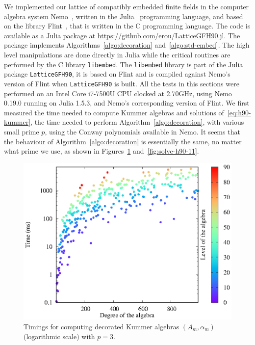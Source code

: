 We implemented our lattice of compatibly embedded finite fields in the computer
algebra system Nemo~\cite{Nemo}, written in the Julia~\cite{Julia} programming
language, and based on the library Flint~\cite{Flint}, that is written in the C
programming language. The code is available as a Julia package at
\url{https://github.com/erou/LatticeGFH90.jl}. The package implements
Algorithms~\ref{algo:decoration} and~\ref{algo:std-embed}. The high level
manipulations are done directly in Julia while the critical routines are
performed by the C library \texttt{libembed}. The \texttt{libembed} library is
part of the Julia package \texttt{LatticeGFH90}, it is based on Flint and is
compiled against Nemo's version of Flint when \texttt{LatticeGFH90} is built.
All the tests in this sections were performed on an
Intel Core i7-7500U CPU clocked at 2.70GHz, using Nemo 0.19.0 running on
Julia 1.5.3, and Nemo’s corresponding version of Flint. We first measured the
time needed to compute Kummer algebras and solutions of~\eqref{eq:h90-kummer},
\ie the time needed to perform Algorithm~\ref{algo:decoration}, with various
small prime $p$, using the Conway polynomials available in Nemo. It seems that
the behaviour of Algorithm~\ref{algo:decoration} is essentially the same, no
matter what prime we use, as shown in Figures~\ref{fig:solve-h90-3}
and~\ref{fig:solve-h90-11}.
\begin{figure}
  \centering
  \includegraphics{benchmarks/lattice-h90/solve-h90-3.eps}
  \caption{Timings for computing decorated Kummer algebras $(A_m, \alpha_m)$ (logarithmic scale)
  with $p=3$.}
  \label{fig:solve-h90-3}
\end{figure}
